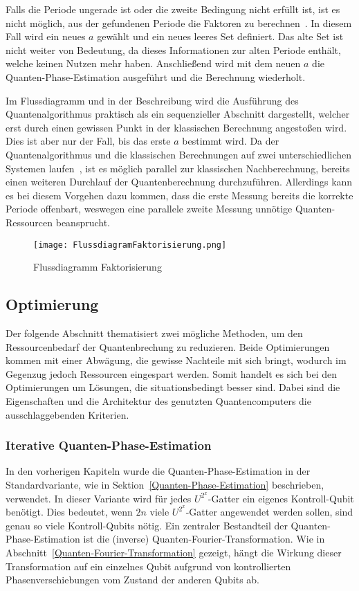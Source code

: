 Falls die Periode ungerade ist oder die zweite Bedingung nicht erfüllt ist, 
ist es nicht möglich, aus der gefundenen Periode die Faktoren zu berechnen~\cite{Shor_1997}.
In diesem Fall wird ein neues \(a\) gewählt und ein neues leeres Set definiert. 
Das alte Set ist nicht weiter von Bedeutung, 
da dieses Informationen zur alten Periode enthält, 
welche keinen Nutzen mehr haben.
Anschließend wird mit dem neuen \(a\) die Quanten-Phase-Estimation ausgeführt und 
die Berechnung wiederholt.

Im Flussdiagramm und in der Beschreibung 
wird die Ausführung des Quantenalgorithmus praktisch als ein sequenzieller Abschnitt dargestellt, 
welcher erst durch einen gewissen Punkt in der klassischen Berechnung angestoßen wird.
Dies ist aber nur der Fall, bis das erste \(a\) bestimmt wird.
Da der Quantenalgorithmus und die klassischen Berechnungen auf zwei unterschiedlichen Systemen laufen~\cite{IBMQuantumServerless2023}, 
ist es möglich parallel zur klassischen Nachberechnung, 
bereits einen weiteren Durchlauf der Quantenberechnung durchzuführen. 
Allerdings kann es bei diesem Vorgehen dazu kommen, 
dass die erste Messung bereits die korrekte Periode offenbart, 
weswegen eine parallele zweite Messung unnötige Quanten-Ressourcen beansprucht.

\begin{figure} 
\caption{Flussdiagramm Faktorisierung}
\label{fig:Flussdiagramm}
\texttt{[image: FlussdiagramFaktorisierung.png]}
\centering
\end{figure}

\subsection{Optimierung} \label{Optimierung}
Der folgende Abschnitt thematisiert zwei mögliche Methoden, 
um den Ressourcenbedarf der Quantenbrechung zu reduzieren.
Beide Optimierungen kommen mit einer Abwägung, 
die gewisse Nachteile mit sich bringt,
wodurch im Gegenzug jedoch Ressourcen eingespart werden.
Somit handelt es sich bei den Optimierungen um Lösungen, 
die situationsbedingt besser sind.
Dabei sind die Eigenschaften und die Architektur des genutzten Quantencomputers die ausschlaggebenden Kriterien.

\subsubsection{Iterative Quanten-Phase-Estimation}
In den vorherigen Kapiteln wurde die Quanten-Phase-Estimation in der Standardvariante, 
wie in Sektion~\ref{Quanten-Phase-Estimation} beschrieben, verwendet.
In dieser Variante wird für jedes \(U^{2^x}\)-Gatter ein eigenes Kontroll-Qubit benötigt.
Dies bedeutet, wenn \(2n\) viele \(U^{2^x}\)-Gatter angewendet werden sollen, 
sind genau so viele Kontroll-Qubits nötig.
Ein zentraler Bestandteil der Quanten-Phase-Estimation ist die (inverse) Quanten-Fourier-Transformation. 
Wie in Abschnitt~\ref{Quanten-Fourier-Transformation} gezeigt, 
hängt die Wirkung dieser Transformation auf ein einzelnes Qubit aufgrund von kontrollierten Phasenverschiebungen vom Zustand der anderen Qubits ab.

